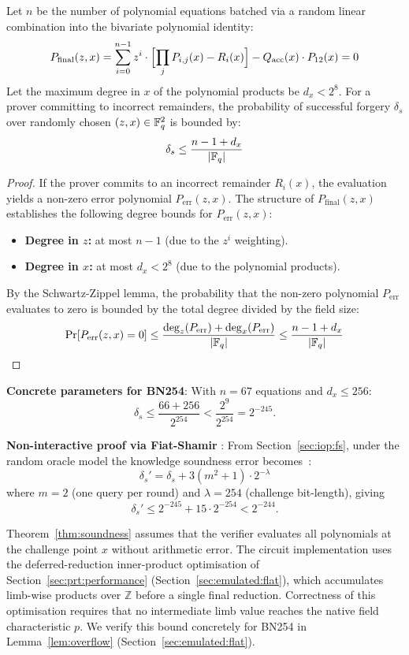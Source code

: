 \begin{theorem}[Soundness]\label{thm:soundness}
Let $n$ be the number of polynomial equations batched via a random linear combination into the bivariate polynomial identity:
$$P_{\mathrm{final}}(z, x) = \sum_{i=0}^{n-1} z^i \cdot \Bigl[\prod_{j} P_{i,j}(x) - R_i(x)\Bigr] - Q_{\mathrm{acc}}(x) \cdot P_{12}(x) = 0$$
Let the maximum degree in $x$ of the polynomial products be $d_x < 2^8$. For a prover committing to incorrect remainders, the probability of successful forgery $\delta_s$ over randomly chosen $(z,x) \in \mathbb{F}_q^2$ is bounded by:
$$\delta_s \leq \frac{n - 1 + d_x}{|\mathbb{F}_q|}$$
\end{theorem}

\begin{proof}
If the prover commits to an incorrect remainder $R_i(x)$, the evaluation yields a non-zero error polynomial $P_{\mathrm{err}}(z, x)$. The structure of $P_{\mathrm{final}}(z, x)$ establishes the following degree bounds for $P_{\mathrm{err}}(z, x)$:
\begin{itemize}
    \item \textbf{Degree in $z$:} at most $n - 1$ (due to the $z^i$ weighting).
    \item \textbf{Degree in $x$:} at most $d_x < 2^8$ (due to the polynomial products).
\end{itemize}
By the Schwartz-Zippel lemma, the probability that the non-zero polynomial $P_{\mathrm{err}}$ evaluates to zero is bounded by the total degree divided by the field size:
$$\Pr[P_{\mathrm{err}}(z, x) = 0] \leq \frac{\deg_z(P_{\mathrm{err}}) + \deg_x(P_{\mathrm{err}})}{|\mathbb{F}_q|} \leq \frac{n - 1 + d_x}{|\mathbb{F}_q|}$$
\end{proof}

\textbf{Concrete parameters for BN254}: With $n = 67$ equations and $d_x \leq 256$:
$$\delta_s \leq \frac{66 + 256}{2^{254}} < \frac{2^9}{2^{254}} = 2^{-245}.$$

\textbf{Non-interactive proof via Fiat-Shamir} \label{sec:iop:soundness:fs}: From Section~\ref{sec:iop:fs}, under the random oracle model the
knowledge soundness error becomes~\cite{TCC:BenChiSpo16}:
$$\delta_s' = \delta_s + 3(m^2 + 1) \cdot 2^{-\lambda}$$
where $m = 2$ (one query per round) and $\lambda = 254$ (challenge bit-length), giving
$$\delta_s' \leq 2^{-245} + 15 \cdot 2^{-254} < 2^{-244}.$$

\begin{remark}\label{rem:overflow}
Theorem~\ref{thm:soundness} assumes that the verifier evaluates all polynomials at the
challenge point $x$ without arithmetic error.  The circuit implementation uses the
deferred-reduction inner-product optimisation of Section~\ref{sec:prt:performance}
(Section~\ref{sec:emulated:flat}), which accumulates limb-wise products over $\mathbb{Z}$
before a single final reduction.  Correctness of this optimisation requires that no
intermediate limb value reaches the native field characteristic $p$.  We verify this
bound concretely for BN254 in Lemma~\ref{lem:overflow} (Section~\ref{sec:emulated:flat}).
\end{remark}

